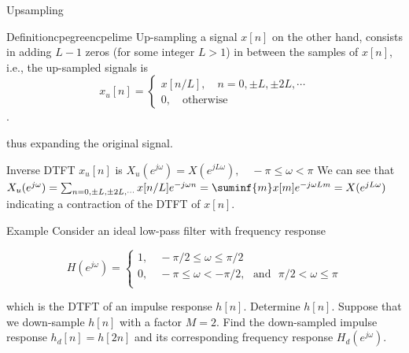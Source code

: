 \documentclass[aspectratio=169,xcolor=dvipsnames,svgnames,x11names,fleqn]{beamer}
\begin{document}
\begin{frame}{Upsampling}
    \begin{custombox}{Definition}{cpegreen}{cpelime}
    Up-sampling a signal $x[n]$ on the other hand, consists in adding $L - 1$ zeros (for some integer $L > 1$) in between the samples of $x[n]$, i.e., the up-sampled signals is
    $$
    x_u[n] = \begin{cases}
        x[n/L], \quad n = 0, \pm L, \pm 2L, \cdots\\
        0, \quad \textrm{otherwise}
    \end{cases}
    $$.
\end{custombox}
thus expanding the original signal.

Inverse DTFT $x_u[n]$ is
$
X_u(e^{j\omega}) = X(e^{jL\omega}), \quad -\pi \leq \omega < \pi
$
We can see that $X_u(e^{j\omega}) = \sum_{n = 0, \pm L, \pm 2L, \cdots}x[n/L]e^{-j\omega n} = \suminf{m} x[m] e^{-j\omega L m} = X(e^{jL\omega})$
indicating a contraction of the DTFT of $x[n]$.

\end{frame}

\begin{frame}{Example}
    Consider an ideal low-pass filter with frequency response

    $$
    H(e^{j\omega}) = \begin{cases}
        1, \quad -\pi/2 \leq \omega \leq \pi/2\\
        0, \quad -\pi \leq \omega < -\pi/2, ~~~\textrm{and}~~~ \pi/2 < \omega \leq \pi \\
    \end{cases}
    $$

    which is the DTFT of an impulse response $h[n]$. Determine $h[n]$. Suppose that we down-sample $h[n]$ with a factor $M = 2$. Find the down-sampled impulse response $h_d [n] = h[2n]$ and its corresponding
frequency response $H_d (e^{j\omega})$.

\end{frame}

\begin{frame}{}
\vspace*{-9\baselineskip}
    \color{LightGray}{Blank space for calculation}
\end{frame}
\begin{frame}{}
\vspace*{-9\baselineskip}
    \color{LightGray}{Blank space for calculation}
\end{frame}
\begin{frame}{}
\vspace*{-9\baselineskip}
    \color{LightGray}{Blank space for calculation}
\end{frame}
\begin{frame}{}
\vspace*{-9\baselineskip}
    \color{LightGray}{Blank space for calculation}
\end{frame}
\begin{frame}{}
\vspace*{-9\baselineskip}
    \color{LightGray}{Blank space for calculation}
\end{frame}
\end{document}
